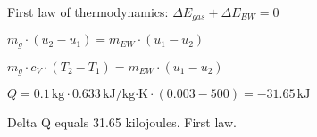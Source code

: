 First law of thermodynamics:  
\( \Delta E_{gas} + \Delta E_{EW} = 0 \)  

\( m_g \cdot (u_2 - u_1) = m_{EW} \cdot (u_1 - u_2) \)  

\( m_g \cdot c_V \cdot (T_2 - T_1) = m_{EW} \cdot (u_1 - u_2) \)  

\( Q = 0.1 \, \text{kg} \cdot 0.633 \, \text{kJ/kg·K} \cdot (0.003 - 500) = -31.65 \, \text{kJ} \)

Delta Q equals 31.65 kilojoules.  
First law.